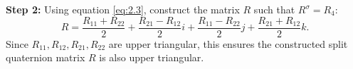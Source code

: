 \documentclass[3p]{elsarticle}
\numberwithin{equation}{section}
\begin{document}
\textbf{Step 2:} Using equation \eqref{eq:2.3}, construct the matrix $R$ such that $R^\sigma=R_4:$
$$
R = \frac{R_{11} + R_{22}}{2} + \frac{R_{21} - R_{12}}{2}i + \frac{R_{11} - R_{22}}{2}j + \frac{R_{21} + R_{12}}{2}k.
$$
Since $R_{11}, R_{12}, R_{21}, R_{22}$ are upper triangular, this ensures the constructed split quaternion matrix $R$ is also upper triangular.

\end{document}
